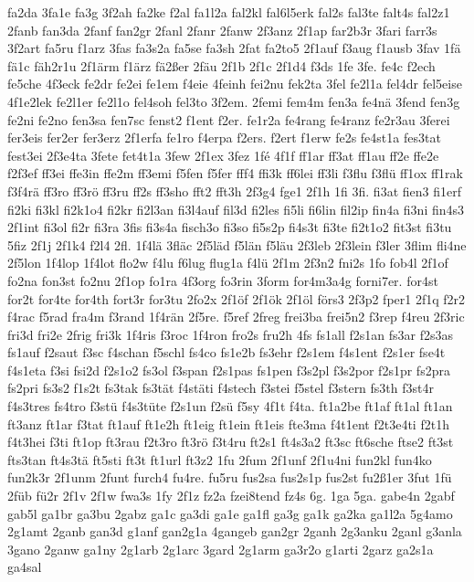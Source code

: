 {fa2da
3fa1e
fa3g
3f2ah
fa2ke
f2al
fa1l2a
fal2kl
fal6l5erk
fal2s
fal3te
falt4s
fal2z1
2fanb
fan3da
2fanf
fan2gr
2fanl
2fanr
2fanw
2f3anz
2f1ap
far2b3r
3fari
farr3s
3f2art
fa5ru
f1arz
3fas
fa3s2a
fa5se
fa3sh
2fat
fa2to5
2f1auf
f3aug
f1ausb
3fav
1fä
fä1c
fäh2r1u
2f1ärm
f1ärz
fä2ßer
2fäu
2f1b
2f1c
2f1d4
f3ds
1fe
3fe.
fe4c
f2ech
fe5che
4f3eck
fe2dr
fe2ei
fe1em
f4eie
4feinh
fei2nu
fek2ta
3fel
fe2l1a
fel4dr
fel5eise
4f1e2lek
fe2l1er
fe2l1o
fel4soh
fel3to
3f2em.
2femi
fem4m
fen3a
fe4nä
3fend
fen3g
fe2ni
fe2no
fen3sa
fen7sc
fenst2
f1ent
f2er.
fe1r2a
fe4rang
fe4ranz
fe2r3au
3ferei
fer3eis
fer2er
fer3erz
2f1erfa
fe1ro
f4erpa
f2ers.
f2ert
f1erw
fe2s
fe4st1a
fes3tat
fest3ei
2f3e4ta
3fete
fet4t1a
3few
2f1ex
3fez
1fé
4f1f
ff1ar
ff3at
ff1au
ff2e
ffe2e
f2f3ef
ff3ei
ffe3in
ffe2m
ff3emi
f5fen
f5fer
fff4
ffi3k
ff6lei
ff3li
f3flu
f3flü
ff1ox
ff1rak
f3f4rä
ff3ro
ff3rö
ff3ru
ff2s
ff3sho
fft2
fft3h
2f3g4
fge1
2f1h
1fi
3fi.
fi3at
fien3
fi1erf
fi2ki
fi3kl
fi2k1o4
fi2kr
fi2l3an
fi3l4auf
fil3d
fi2les
fi5li
fi6lin
fil2ip
fin4a
fi3ni
fin4s3
2f1int
fi3ol
fi2r
fi3ra
3fis
fi3s4a
fisch3o
fi3so
fi5s2p
fi4s3t
fi3te
fi2t1o2
fit3st
fi3tu
5fiz
2f1j
2f1k4
f2l4
2fl.
1f4lä
3fläc
2f5läd
f5län
f5läu
2f3leb
2f3lein
f3ler
3flim
fli4ne
2f5lon
1f4lop
1f4lot
flo2w
f4lu
f6lug
flug1a
f4lü
2f1m
2f3n2
fni2s
1fo
fob4l
2f1of
fo2na
fon3st
fo2nu
2f1op
fo1ra
4f3org
fo3rin
3form
for4m3a4g
forni7er.
for4st
for2t
for4te
for4th
fort3r
for3tu
2fo2x
2f1öf
2f1ök
2f1öl
förs3
2f3p2
fper1
2f1q
f2r2
f4rac
f5rad
fra4m
f3rand
1f4rän
2f5re.
f5ref
2freg
frei3ba
frei5n2
f3rep
f4reu
2f3ric
fri3d
fri2e
2frig
fri3k
1f4ris
f3roc
1f4ron
fro2s
fru2h
4fs
fs1all
f2s1an
fs3ar
f2s3as
fs1auf
f2saut
f3sc
f4schan
f5schl
fs4co
fs1e2b
fs3ehr
f2s1em
f4s1ent
f2s1er
fse4t
f4s1eta
f3si
fsi2d
f2s1o2
fs3ol
f3span
f2s1pas
fs1pen
f3s2pl
f3s2por
f2s1pr
fs2pra
fs2pri
fs3s2
f1s2t
fs3tak
fs3tät
f4stäti
f4stech
f3stei
f5stel
f3stern
fs3th
f3st4r
f4s3tres
fs4tro
f3stü
f4s3tüte
f2s1un
f2sü
f5sy
4f1t
f4ta.
ft1a2be
ft1af
ft1al
ft1an
ft3anz
ft1ar
f3tat
ft1auf
ft1e2h
ft1eig
ft1ein
ft1eis
fte3ma
f4t1ent
f2t3e4ti
f2t1h
f4t3hei
f3ti
ft1op
ft3rau
f2t3ro
ft3rö
f3t4ru
ft2s1
ft4s3a2
ft3sc
ft6sche
ftse2
ft3st
fts3tan
ft4s3tä
ft5sti
ft3t
ft1url
ft3z2
1fu
2fum
2f1unf
2f1u4ni
fun2kl
fun4ko
fun2k3r
2f1unm
2funt
furch4
fu4re.
fu5ru
fus2sa
fus2s1p
fus2st
fu2ß1er
3fut
1fü
2füb
fü2r
2f1v
2f1w
fwa3s
1fy
2f1z
fz2a
fzei8tend
fz4s
6g.
1ga
5ga.
gabe4n
2gabf
gab5l
ga1br
ga3bu
2gabz
ga1c
ga3di
ga1e
ga1fl
ga3g
ga1k
ga2ka
ga1l2a
5g4amo
2g1amt
2ganb
gan3d
g1anf
gan2g1a
4gangeb
gan2gr
2ganh
2g3anku
2ganl
g3anla
3gano
2ganw
ga1ny
2g1arb
2g1arc
3gard
2g1arm
ga3r2o
g1arti
2garz
ga2s1a
ga4sal
}
